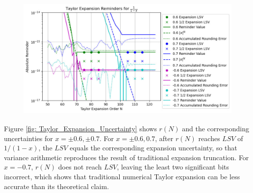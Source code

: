 \documentclass[twoside]{article}
\numberwithin{equation}{section}
\begin{document}
\begin{figure}[p]
\centering
\includegraphics[height=2.4in]{Taylor_Expansion.pdf} 
\label{fig: Taylor_Expansion}
\end{figure}


Figure \ref{fig: Taylor_Expansion_Uncertainty} shows $r(N)$ and the corresponding uncertainties for $x = \pm 0.6, \pm 0.7$.
For $x = \pm 0.6, 0.7$, after $r(N)$ reaches $LSV$ of $1/(1-x)$, the $LSV$ equals the corresponding expansion uncertainty, so that variance arithmetic reproduces the result of traditional expansion truncation. 
For $x = -0.7$, $r(N)$ does not reach $LSV$, leaving the least two significant bits incorrect, which shows that traditional numerical Taylor expansion can be less accurate than its theoretical claim.
\end{document}
